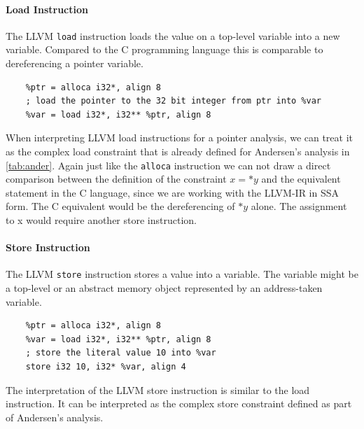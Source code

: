 \paragraph{Load Instruction}
The LLVM \verb|load| instruction loads the value on a top-level variable into a new variable. Compared to the C programming language this is comparable to dereferencing a pointer variable.
\begin{verbatim}
    %ptr = alloca i32*, align 8
    ; load the pointer to the 32 bit integer from ptr into %var
    %var = load i32*, i32** %ptr, align 8
\end{verbatim}
When interpreting LLVM load instructions for a pointer analysis, we can treat it as the complex load constraint that is already defined for Andersen's analysis in \autoref{tab:ander}.
Again just like the \verb|alloca| instruction we can not draw a direct comparison between the definition of the constraint $x = *y$ and the equivalent statement in the C language, since we are working with the LLVM-IR in SSA form.
The C equivalent would be the dereferencing of $*y$ alone. The assignment to x would require another store instruction.

\paragraph{Store Instruction}
The LLVM \verb|store| instruction stores a value into a variable. The variable might be a top-level or an abstract memory object represented by an address-taken variable.
\begin{verbatim}
    %ptr = alloca i32*, align 8
    %var = load i32*, i32** %ptr, align 8
    ; store the literal value 10 into %var
    store i32 10, i32* %var, align 4
\end{verbatim}
The interpretation of the LLVM store instruction is similar to the load instruction. It can be interpreted as the complex store constraint defined as part of Andersen's analysis.

